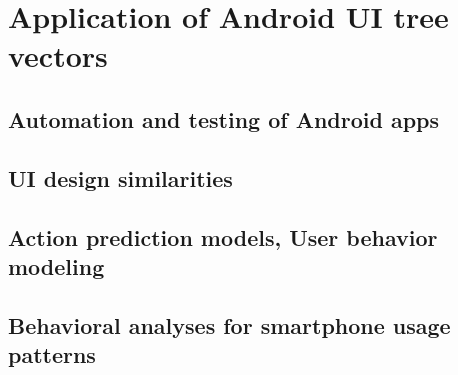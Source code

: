 \chapter{Application of Android UI tree vectors}

\section{Automation and testing of Android apps}
\section{UI design similarities}
\section{Action prediction models, User behavior modeling}
\section{Behavioral analyses for smartphone usage patterns}